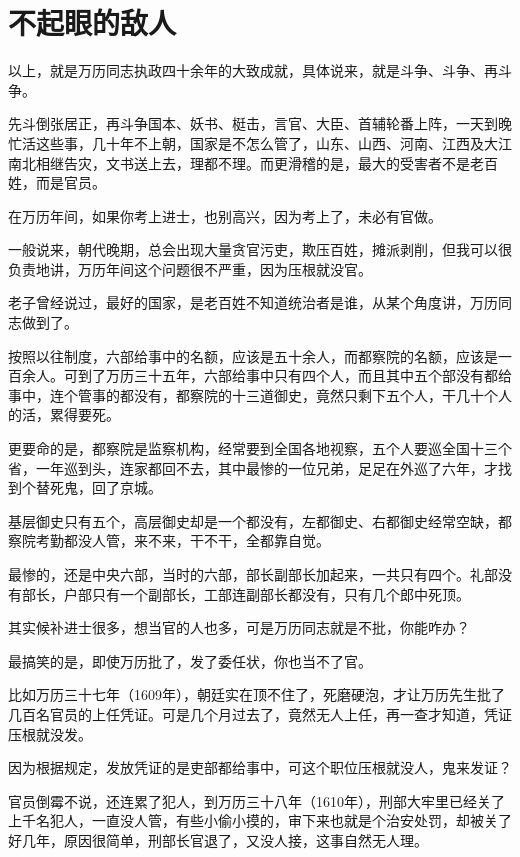 \section{不起眼的敌人}
\ifnum{}
	\begin{multicols}{\theparacolNo}
		\fi
		以上，就是万历同志执政四十余年的大致成就，具体说来，就是斗争、斗争、再斗争。

		先斗倒张居正，再斗争国本、妖书、梃击，言官、大臣、首辅轮番上阵，一天到晚忙活这些事，几十年不上朝，国家是不怎么管了，山东、山西、河南、江西及大江南北相继告灾，文书送上去，理都不理。而更滑稽的是，最大的受害者不是老百姓，而是官员。

		在万历年间，如果你考上进士，也别高兴，因为考上了，未必有官做。

		一般说来，朝代晚期，总会出现大量贪官污吏，欺压百姓，摊派剥削，但我可以很负责地讲，万历年间这个问题很不严重，因为压根就没官。

		老子曾经说过，最好的国家，是老百姓不知道统治者是谁，从某个角度讲，万历同志做到了。

		按照以往制度，六部给事中的名额，应该是五十余人，而都察院的名额，应该是一百余人。可到了万历三十五年，六部给事中只有四个人，而且其中五个部没有都给事中，连个管事的都没有，都察院的十三道御史，竟然只剩下五个人，干几十个人的活，累得要死。

		更要命的是，都察院是监察机构，经常要到全国各地视察，五个人要巡全国十三个省，一年巡到头，连家都回不去，其中最惨的一位兄弟，足足在外巡了六年，才找到个替死鬼，回了京城。

		基层御史只有五个，高层御史却是一个都没有，左都御史、右都御史经常空缺，都察院考勤都没人管，来不来，干不干，全都靠自觉。

		最惨的，还是中央六部，当时的六部，部长副部长加起来，一共只有四个。礼部没有部长，户部只有一个副部长，工部连副部长都没有，只有几个郎中死顶。

		其实候补进士很多，想当官的人也多，可是万历同志就是不批，你能咋办？

		最搞笑的是，即使万历批了，发了委任状，你也当不了官。

		比如万历三十七年（1609年），朝廷实在顶不住了，死磨硬泡，才让万历先生批了几百名官员的上任凭证。可是几个月过去了，竟然无人上任，再一查才知道，凭证压根就没发。

		因为根据规定，发放凭证的是吏部都给事中，可这个职位压根就没人，鬼来发证？

		官员倒霉不说，还连累了犯人，到万历三十八年（1610年），刑部大牢里已经关了上千名犯人，一直没人管，有些小偷小摸的，审下来也就是个治安处罚，却被关了好几年，原因很简单，刑部长官退了，又没人接，这事自然无人理。


\end{multicols}
